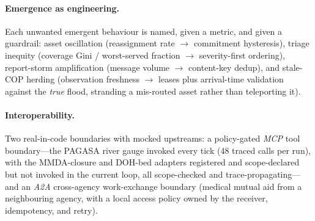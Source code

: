\documentclass[11pt]{article}
\begin{document}
\paragraph{Emergence as engineering.} Each unwanted emergent behaviour is named, given a metric, and
given a guardrail: asset oscillation (reassignment rate $\to$ commitment hysteresis), triage inequity
(coverage Gini / worst-served fraction $\to$ severity-first ordering), report-storm amplification (message
volume $\to$ content-key dedup), and stale-COP herding (observation freshness $\to$ leases plus
arrival-time validation against the \emph{true} flood, stranding a mis-routed asset rather than
teleporting it).

\paragraph{Interoperability.} Two real-in-code boundaries with mocked upstreams: a policy-gated
\emph{MCP} tool boundary---the PAGASA river gauge invoked every tick (48 traced calls per run), with the
MMDA-closure and DOH-bed adapters registered and scope-declared but not invoked in the current loop, all
scope-checked and trace-propagating---and an \emph{A2A} cross-agency work-exchange boundary (medical
mutual aid from a neighbouring agency, with a local access policy owned by the receiver, idempotency, and
retry).
\end{document}
